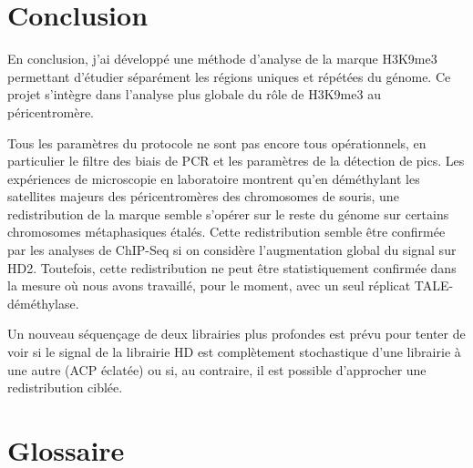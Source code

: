 \documentclass[a4paper,12pt,times]{report}
\begin{document}
 \chapter*{{
\vspace*{-2cm}}Conclusion}

En conclusion, j'ai développé une méthode d'analyse de la marque H3K9me3 permettant d'étudier séparément les régions uniques et répétées du génome. Ce projet s'intègre dans l'analyse plus globale du rôle de H3K9me3 au péricentromère.

\bigskip
Tous les paramètres du protocole ne sont pas encore tous opérationnels, en particulier le filtre des biais de PCR et les paramètres de la détection de pics.
\newline
Les expériences de microscopie en laboratoire montrent qu'en déméthylant les satellites majeurs des péricentromères des chromosomes de souris, une redistribution de la marque semble s'opérer sur le reste du génome sur certains chromosomes métaphasiques étalés.
Cette redistribution semble être confirmée par les analyses de ChIP-Seq si on considère l'augmentation global du signal sur HD2.  Toutefois, cette redistribution ne peut être statistiquement confirmée dans la mesure où nous avons travaillé, pour le moment, avec un seul réplicat TALE-déméthylase. 

\bigskip 
Un nouveau séquençage de deux librairies plus profondes est prévu pour tenter de voir si le signal de la librairie HD est complètement stochastique d'une librairie à une autre (ACP éclatée) ou si, au contraire, il est possible d'approcher une redistribution ciblée.
\newpage


\newpage
\chapter*{{\vspace*{-2cm}}Glossaire}
\end{document}
